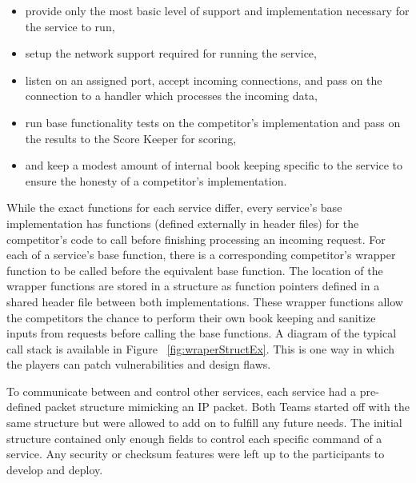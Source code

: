\documentclass[10pt]{article}
\begin{document}
\begin{itemize}
    \item provide only the most basic level of support and implementation
    necessary for the service to run, 
    \item setup the network support required for running the service,
    \item listen on an assigned port, accept incoming connections, and pass on
    the connection to a handler which processes the incoming data,
    \item run base functionality tests on the competitor's implementation and
    pass on the results to the Score Keeper for scoring,
    \item and keep a modest amount of internal book keeping specific to the
    service to ensure the honesty of a competitor's implementation.
\end{itemize}

While the exact functions for each service differ, every service's base
implementation has functions (defined externally in header files) for the
competitor's code to call before finishing processing an incoming request. For
each of a service's base function, there is a corresponding competitor's
wrapper function to be called before the equivalent base function. The location
of the wrapper functions are stored in a structure as function pointers defined
in a shared header file between both implementations. These wrapper functions
allow the competitors the chance to perform their own book keeping and sanitize
inputs from requests before calling the base functions. A diagram of the
typical call stack is available in Figure ~\ref{fig:wraperStructEx}. This is one
way in which the players can patch vulnerabilities and design flaws.

To communicate between and control other services, each service had a
pre-defined packet structure mimicking an IP packet. Both Teams started off with
the same structure but were allowed to add on to fulfill any future needs. The
initial structure contained only enough fields to control each specific command
of a service. Any security or checksum features were left up to the participants
to develop and deploy. 
\end{document}
